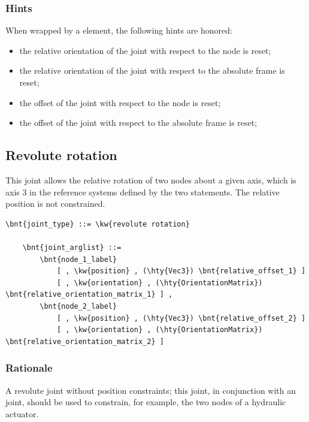 \subsubsection{Hints}
When wrapped by a  element, the following hints are honored:
\begin{itemize}
\item {} the relative orientation of the joint
with respect to the node is reset;
\item {} the relative orientation of the joint
with respect to the absolute frame is reset;
\item {} the offset of the joint
with respect to the node is reset;
\item {} the offset of the joint
with respect to the absolute frame is reset;
\end{itemize}






\subsection{Revolute rotation}
\label{sec:EL:STRUCT:JOINT:REVOLUTE_ROTATION}
This joint allows the relative rotation of two nodes about
a given axis, which is axis 3 in the reference systems defined 
by the two  statements.
The relative position is not constrained.
\begin{Verbatim}[commandchars=\\\{\}]
    \bnt{joint_type} ::= \kw{revolute rotation}

    \bnt{joint_arglist} ::= 
        \bnt{node_1_label}
            [ , \kw{position} , (\hty{Vec3}) \bnt{relative_offset_1} ]
            [ , \kw{orientation} , (\hty{OrientationMatrix}) \bnt{relative_orientation_matrix_1} ] ,
        \bnt{node_2_label}
            [ , \kw{position} , (\hty{Vec3}) \bnt{relative_offset_2} ]
            [ , \kw{orientation} , (\hty{OrientationMatrix}) \bnt{relative_orientation_matrix_2} ]
\end{Verbatim}

\subsubsection{Rationale}
A revolute joint without position constraints; this joint, in conjunction
with an  joint, should be used to constrain, for example,
the two nodes of a hydraulic actuator.

